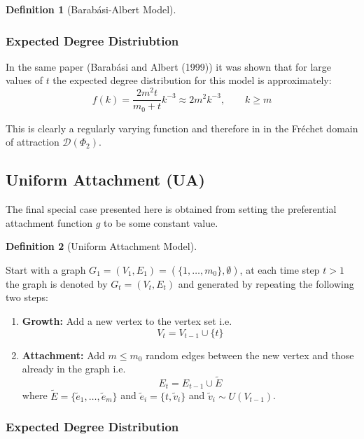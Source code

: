 \documentclass[
  10pt,
  a4paper,
]{scrreprt}
\providecommand{\tightlist}{%
  \setlength{\itemsep}{0pt}\setlength{\parskip}{0pt}}\usepackage{longtable,booktabs,array}
\theoremstyle{definition}
\newtheorem{definition}{Definition}[section]
\theoremstyle{plain}
\theoremstyle{remark}
\begin{document}
{\begin{definition}[Barabási-Albert
Model]
\end{definition}

\hypertarget{expected-degree-distriubtion}{%
\subsubsection{Expected Degree
Distriubtion}\label{expected-degree-distriubtion}}

In the same paper (Barabási and Albert (1999)) it was shown that for
large values of \(t\) the expected degree distribution for this model is
approximately: \[
f(k) = \displaystyle\frac{2m^2t}{m_0+t}k^{-3} \approx 2m^2k^{-3},\qquad k\ge m
\]

This is clearly a regularly varying function and therefore in in the
Fréchet domain of attraction \(\mathcal D(\Phi_2)\).

\hypertarget{uniform-attachment-ua}{%
\subsection{Uniform Attachment (UA)}\label{uniform-attachment-ua}}

The final special case presented here is obtained from setting the
preferential attachment function \(g\) to be some constant value.

\begin{definition}[Uniform Attachment
Model]\protect\hypertarget{def-ua}{}\label{def-ua}

Start with a graph \(G_1 = (V_1, E_1) = (\{1,\ldots,m_0\}, \emptyset)\),
at each time step \(t>1\) the graph is denoted by \(G_t=(V_t, E_t)\) and
generated by repeating the following two steps:

\begin{enumerate}
\def\labelenumi{\arabic{enumi}.}
\tightlist
\item
  \textbf{Growth:} Add a new vertex to the vertex set i.e.~ \[
  V_t=V_{t-1}\cup\{t\}
  \]
\item
  \textbf{Attachment:} Add \(m\le m_0\) random edges between the new
  vertex and those already in the graph i.e.~ \[
  E_t = E_{t-1} \cup \tilde E
  \] where \(\tilde E = \{\tilde e_1,\ldots, \tilde e_m\}\) and
  \(\tilde e_i = \{t,\tilde v_i\}\) and \(\tilde v_i \sim U(V_{t-1})\).
\end{enumerate}

\end{definition}

\hypertarget{expected-degree-distribution}{%
\subsubsection{Expected Degree
Distribution}\label{expected-degree-distribution}}

}
\end{document}
